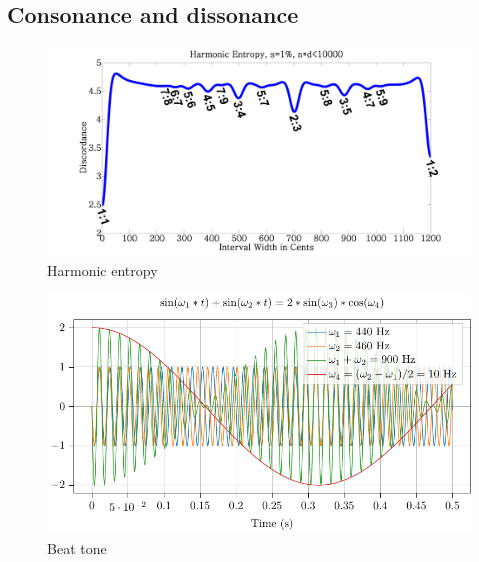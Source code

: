 \documentclass{article}
\begin{document}







\subsection{Consonance and dissonance}

\begin{figure}[h!]
	\centering
	\hspace*{0cm}
	\includegraphics[scale=0.03, trim= {0cm 0cm 0cm 0cm}, clip]{Harmonic_entropy.png}
	\caption{Harmonic entropy}
	\label{fig}
\end{figure}

\begin{figure}[h!]
	\centering
	\hspace*{0cm}
	\includegraphics[scale=0.5, trim= {0cm 0cm 0cm 0cm}, clip]{battement/main.pdf}
	\caption{Beat tone}
	\label{fig}
\end{figure}
\end{document}
